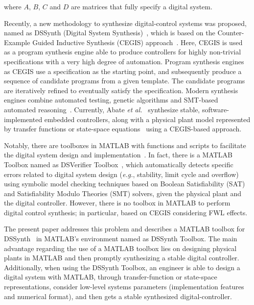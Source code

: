 \documentclass[sigconf]{acmart}
\newcommand\tool{{DSSynth Toolbox}\xspace}
\begin{document}
\noindent where $A$, $B$, $C$ and $D$ are matrices that fully specify a digital system. 

Recently, a new methodology to synthesize digital-control systems was proposed, 
named as DSSynth (Digital System Synthesis)~\cite{abate2017, abatecav2017}, 
which is based on the Counter-Example Guided Inductive Synthesis 
(CEGIS) approach~\cite{DBLP:conf/asplos/Solar-LezamaTBSS06}. Here, CEGIS is used
as a program synthesis engine able to produce controllers for highly non-trivial 
specifications with a very high degree of automation. Program synthesis engines 
as CEGIS use a specification as the starting point, and subsequently 
produce a sequence of candidate programs from a given template. The candidate programs 
are iteratively refined to eventually satisfy the specification. Modern synthesis engines combine 
automated testing, genetic algorithms and SMT-based automated reasoning~\cite{DBLP:journals/corr/AlurFSS16a, DBLP:conf/lpar/DavidKL15}. 
Currently, Abate {\it et al.}~\cite{abate2017} synthesize stable, software-implemented 
embedded controllers, along with a physical plant model represented by transfer functions 
or state-space equations~\cite{abate2017,abatecav2017} using a CEGIS-based approach.

Notably, there are toolboxes in MATLAB with functions and scripts to facilitate the 
digital system design and implementation~\cite{matlab-toolbox}. In fact, there is a MATLAB 
Toolbox named as DSVerifier Toolbox~\cite{issta2017}, which automatically detects 
specific errors related to digital system design ({\it e.g.}, stability, limit cycle and overflow) 
using symbolic model checking techniques based on Boolean Satisfiability (SAT) and 
Satisfiability Modulo Theories (SMT) solvers, given the physical plant and the digital controller. 
However, there is no toolbox in MATLAB to perform digital control synthesis; in particular, based on 
CEGIS considering FWL effects.

The present paper addresses this problem and describes a MATLAB toolbox for DSSynth~\cite{abate2017, abatecav2017} 
in MATLAB's environment named as \tool. The main advantage regarding the use of a MATLAB toolbox 
lies on designing physical plants in MATLAB and then promptly synthesizing a stable digital controller. 
Additionally, when using the \tool, an engineer is able to design a digital system with MATLAB, 
through transfer-function or state-space representations, consider low-level systems parameters 
(implementation features and numerical format), and then gets a stable synthesized digital-controller.
\end{document}
